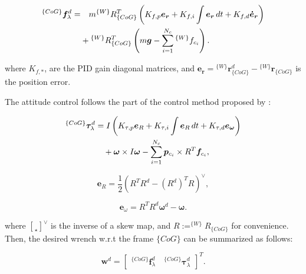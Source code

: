 \begin{align}
  {}^{\{CoG\}} \bm{f}_{\lambda}^{d} = 
  & \quad m {^{\{W\}}R_{\{CoG\}}^{T}} 
  \left( K_{f,p} \bm{e_r} + K_{f,i} \int \bm{e_r} \, dt + K_{f,d} \bm{\dot{e}_r} \right) \notag \\
  & + {^{\{W\}}R_{\{CoG\}}^{T}} 
  \left( m\bm{g} - \sum_{i=1}^{N_c} {^{\{W\}} f_{c_i}} \right).
  \end{align}

where $K_{f,*}$, are the PID gain diagonal matrices, and $\bm{e_r} = {}^{\{W\}}\bm{r}_{\{CoG\}}^{d} - {}^{\{W\}}\bm{r}_{\{CoG\}}$ is the position error.

The attitude control follows the part of the control method
proposed by \cite{lee2010geometric}:

\begin{align}
  ^{\{CoG\}} \bm{\tau}_{\lambda}^{d} &= I 
  \left( K_{\tau,p} \bm{e}_R + K_{\tau,i} \int \bm{e}_R \, dt + K_{\tau,d} \bm{e}_{\bm{\omega}} \right) \notag \\
  & \quad + \bm{\omega} \times I \bm{\omega} - \sum_{i=1}^{N_c} \bm{p}_{c_i} \times R^T \bm{f}_{c_i},
  \end{align}
  
  \begin{equation}
  \bm{e}_R = \frac{1}{2} \left( R^T R^d - (R^d)^T R \right)^{\vee},
  \end{equation}
  
  \begin{equation}
  \bm{e}_{\omega} = R^T R^d \bm{\omega}^d - \bm{\omega}.
  \end{equation}

  where ${\brack{\star}}^\vee$ is the inverse of a skew map, and $R := ^{\{W\}}R_{\{CoG\}}$ for convenience.
  Then, the desired wrench w.r.t the frame $\{CoG\}$ can be summarized as follows:

\begin{equation}
\bm{w}^d = \begin{bmatrix} ^{\{CoG\}} \bm{f}_{\lambda}^{d} \quad ^{\{CoG\}} \bm{\tau}_{\lambda}^{d} \end{bmatrix}^T. 
\end{equation}
  